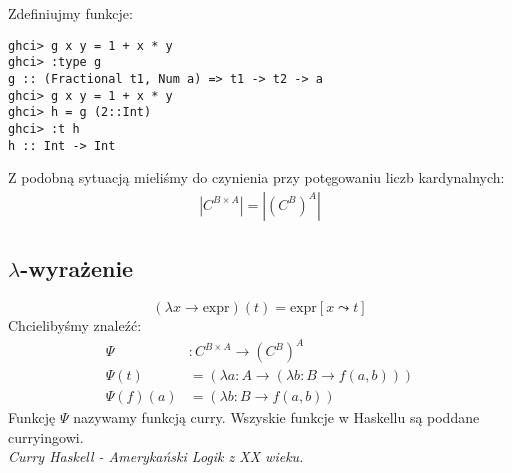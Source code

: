 \documentclass{article}
\newenvironment{definition}[1]{%
    \trivlist
    \item[\hskip\labelsep\textbf{Definition. #1.}]
    \ignorespaces
}{%
    \endtrivlist
}
\begin{document}
\begin{center}
\end{center}

\begin{definition}{w1.hs} Zdefiniujmy funkcje:\\

\begin{verbatim}
ghci> g x y = 1 + x * y
ghci> :type g
g :: (Fractional t1, Num a) => t1 -> t2 -> a
ghci> g x y = 1 + x * y
ghci> h = g (2::Int)
ghci> :t h
h :: Int -> Int
\end{verbatim}
\end{definition}
Z podobną sytuacją mieliśmy do czynienia przy potęgowaniu liczb kardynalnych:
\begin{align}
    \left| C^{B\times A} \right| = \left| \left(C^B\right)^A \right| 
\end{align}
    
\subsection{$\lambda$-wyrażenie}

\begin{definition}{$\lambda$-wyrażenie (funkcja anonimowa)}
\[
    \left(\lambda x \rightarrow \text{expr}\right)(t) = \text{expr}\left[x\leadsto  t\right]
\]
Chcielibyśmy znaleźć:
\begin{align}
\Psi &: C^{B\times A} \rightarrow \left(C^B\right)^A\\
\Psi (t) &= \left(\lambda a : A \rightarrow \left(\lambda b: B \rightarrow f (a,b) \right)\right)\\
\Psi (f) (a) &= (\lambda b : B \rightarrow f(a,b))
\end{align}
Funkcję $\Psi$ nazywamy funkcją curry. Wszyskie funkcje w Haskellu są poddane curryingowi.\\

\textit{Curry Haskell - Amerykański Logik z XX wieku.}\\

\end{definition}
\end{document}
